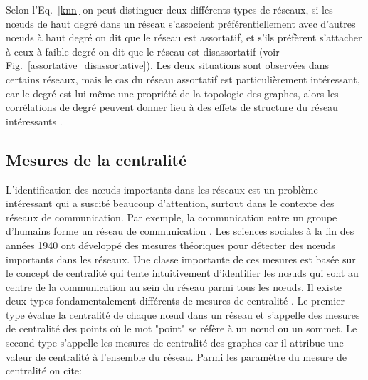 Selon l'Eq.~\eqref{knn} on peut distinguer deux différents types de réseaux, si les nœuds de haut degré dans un réseau  s'associent préférentiellement avec d'autres nœuds à haut degré on dit que le réseau est assortatif, et s'ils préfèrent  s'attacher à ceux à faible degré on dit que le réseau est disassortatif (voir Fig.~\ref{assortative_disassortative}). Les deux situations sont observées dans certains réseaux, mais le cas du réseau assortatif est particulièrement intéressant, car le degré est lui-même une propriété de la topologie des graphes, alors les corrélations de degré peuvent donner lieu à des effets de structure du réseau intéressants \cite{MS2002,Ne2003}. 

\subsection{Mesures de la centralité}

L'identification des nœuds importants dans les réseaux est un problème intéressant qui a suscité beaucoup d'attention, surtout dans le contexte des réseaux de communication. Par exemple, la communication entre un groupe d'humains forme un réseau de communication \cite{Dehmer2011}. Les sciences sociales à la fin des années 1940 ont développé des mesures théoriques pour détecter des nœuds importants dans les réseaux. Une classe importante de ces mesures est basée sur le concept de centralité \cite{Hage-Harary1995,Wasserman-Faust1994} qui tente intuitivement d'identifier les nœuds qui sont au centre de la communication au sein du réseau parmi tous les nœuds. Il existe deux types fondamentalement différents de mesures de centralité \cite{Freeman1977}. Le premier type évalue la centralité de chaque nœud dans un réseau et s'appelle des mesures de centralité des points où le mot "point" se réfère à un nœud ou un sommet. Le second type s'appelle les mesures de centralité des graphes car il attribue une valeur de centralité à l'ensemble du réseau. Parmi les paramètre du mesure de centralité on cite:\\


